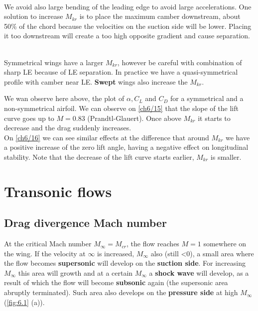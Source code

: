 	\ \\
	 We avoid also large bending of the leading edge to avoid large accelerations. One solution to increase $M_{kr}$ is to place the maximum camber downstream, about 50\% of the chord because the velocities on the suction side will be lower. Placing it too downstream will create a too high opposite gradient and cause separation. 
	
	\ \\ Symmetrical wings have a larger $M_{kr}$, however be careful with combination of sharp LE because of LE separation. In practice we have a quasi-symmetrical profile with camber near LE. \textbf{Swept} wings also increase the $M_{kr}$. 
	
	
	We wan observe here above, the plot of $\alpha, C_L$ and $C_D$ for a symmetrical and a non-symmetrical airfoil. We can observe on \autoref{ch6/15} that the slope of the lift curve goes up to $M=0.83$ (Prandtl-Glauert). Once above $M_{kr}$ it starts to decrease and the drag suddenly increases. \\
	
	On \autoref{ch6/16} we can see similar effects at the difference that around $M_{kr}$ we have a positive increase of the zero lift angle, having a negative effect on longitudinal stability. Note that the decrease of the lift curve starts earlier, $M_{kr}$ is smaller. 
	
\section{Transonic flows}
\subsection{Drag divergence Mach number}
	At the critical Mach number $M_\infty = M_{cr}$, the flow reaches $M=1$ somewhere on the wing. If the velocity at $\infty$ is increased, $M_\infty$ also (still <0), a small area where the flow becomes \textbf{supersonic} will develop on the \textbf{suction side}. For increasing $M_\infty$ this area will growth and at a certain $M_\infty$ a \textbf{shock wave} will develop, as a result of which the flow will become \textbf{subsonic} again (the supersonic area abruptly terminated). Such area also develops on the \textbf{pressure side} at high $M_\infty$ (\autoref{fig:6.1} (a)).
	
